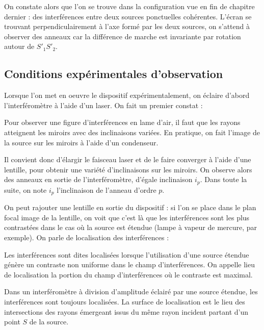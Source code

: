 \documentclass[11pt,fleqn]{book} %
\begin{document}
On constate alors que l'on se trouve dans la configuration vue en fin de chapitre dernier : des interférences entre deux sources ponctuelles cohérentes. L'écran se trouvant perpendiculairement à l'axe formé par les deux sources, on s'attend à observer des anneaux car la différence de marche est invariante par rotation autour de $S'_1 S'_2$.


\subsection{Conditions expérimentales d'observation}

Lorsque l'on met en oeuvre le dispositif expérimentalement, on éclaire d'abord l'interféromètre à l'aide d'un laser. On fait un premier constat :
\begin{proposition}
	Pour observer une figure d'interférences en lame d'air, il faut que les rayons atteignent les miroirs avec des inclinaisons variées. En pratique, on fait l'image de la source sur les miroirs à l'aide d'un condenseur.
\end{proposition}

Il convient donc d'élargir le faisceau laser et de le faire converger à l'aide d'une lentille, pour obtenir une variété d'inclinaisons sur les miroirs. On observe alors des anneaux en sortie de l'interféromètre, d'égale inclinaison $i_p$. Dans toute la suite, on note $i_p$ l'inclinaison de l'anneau d'ordre $p$.


On peut rajouter une lentille en sortie du dispositif : si l'on se place dans le plan focal image de la lentille, on voit que c'est là que les interférences sont les plus contrastées dans le cas où la source est étendue (lampe à vapeur de mercure, par exemple). On parle de localisation des interférences :
\begin{definition}
	Les interférences sont dites localisées lorsque l’utilisation d’une source étendue génère un contraste non uniforme dans le champ d’interférences.
	On appelle lieu de localisation la portion du champ d’interférences où le contraste est maximal.
\end{definition}

\begin{proposition}
	Dans un interféromètre à division d'amplitude éclairé par une source étendue, les interférences sont toujours localisées. La surface de localisation est le lieu des intersections des rayons émergeant issus du même rayon incident partant d'un point $S$ de la source.
\end{proposition}
\end{document}
